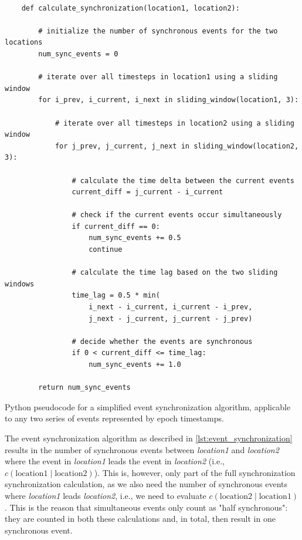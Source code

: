 \begin{listing}[h]
  \begin{verbatim}

    def calculate_synchronization(location1, location2):

        # initialize the number of synchronous events for the two locations
        num_sync_events = 0

        # iterate over all timesteps in location1 using a sliding window
        for i_prev, i_current, i_next in sliding_window(location1, 3):

            # iterate over all timesteps in location2 using a sliding window
            for j_prev, j_current, j_next in sliding_window(location2, 3):

                # calculate the time delta between the current events
                current_diff = j_current - i_current

                # check if the current events occur simultaneously
                if current_diff == 0:
                    num_sync_events += 0.5
                    continue

                # calculate the time lag based on the two sliding windows
                time_lag = 0.5 * min(
                    i_next - i_current, i_current - i_prev,
                    j_next - j_current, j_current - j_prev)

                # decide whether the events are synchronous
                if 0 < current_diff <= time_lag:
                    num_sync_events += 1.0

        return num_sync_events

  \end{verbatim}
  \caption{Python pseudocode for a simplified event synchronization algorithm, applicable to any two series of events represented by epoch timestamps.}
  \label{lst:event_synchronization}
\end{listing}

The event synchronization algorithm as described in \cref{lst:event_synchronization} results in the number of synchronous events between \textit{location1} and \textit{location2} where the event in \textit{location1} leads the event in \textit{location2} (i.e., $c(\text{location1} \mid \text{location2})$). This is, however, only part of the full synchronization synchronization calculation, as we also need the number of synchronous events where \textit{location1} leads \textit{location2}, i.e., we need to evaluate $c(\text{location2} \mid \text{location1})$. This is the reason that simultaneous events only count as "half synchronous": they are counted in both these calculations and, in total, then result in one synchronous event.

